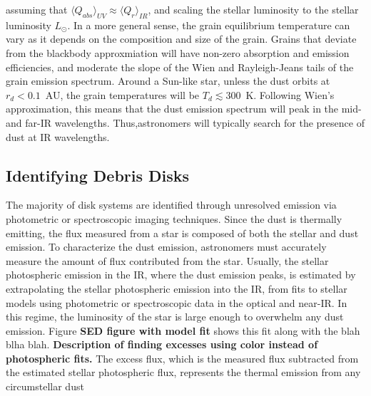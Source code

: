     \noindent assuming that $\langle Q_{abs} \rangle_{UV} \approx \langle Q_{r}\rangle_{IR}$, and scaling the stellar luminosity to the stellar luminosity $L_\odot$. In a more general sense, the grain equilibrium temperature can vary as it depends on the composition and size of the grain\citep{Drain2003}. Grains that deviate from the blackbody approxmiation will have non-zero absorption and emission efficiencies, and moderate the slope of the Wien and Rayleigh-Jeans tails of the grain emission spectrum. Around a Sun-like star, unless the dust orbits at $r_d<0.1$~AU, the grain temperatures will be $T_d \lesssim 300$~K. Following Wien's approximation, this means that the dust emission spectrum will peak in the mid- and far-IR wavelengths. Thus,astronomers will typically search for the presence of dust at IR wavelengths. 
    

    \subsection{Identifying Debris Disks}

    The majority of disk systems are identified through unresolved emission via photometric or spectroscopic imaging techniques. Since the dust is thermally emitting, the flux measured from a star is composed of both the stellar and dust emission. To characterize the dust emission, astronomers must accurately measure the amount of flux contributed from the star. Usually, the stellar photospheric emission in the IR, where the dust emission peaks, is estimated by extrapolating the stellar photospheric emission into the IR, from fits to stellar models using photometric or spectroscopic data in the optical and near-IR. In this regime, the luminosity of the star is large enough to overwhelm any dust emission. Figure \textbf{SED figure with model fit} shows this fit along with the blah blha blah. \textbf{Description of finding excesses using color instead of photospheric fits.} The excess flux, which is the measured flux subtracted from the estimated stellar photospheric flux, represents the thermal emission from any circumstellar dust
        
